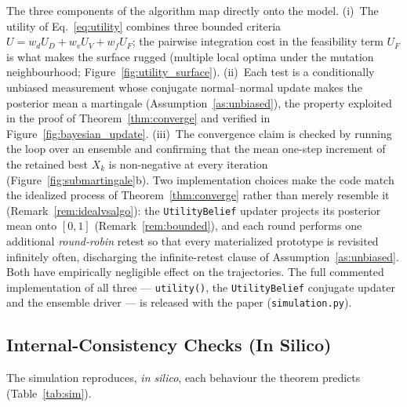 \documentclass[11pt]{article}
\begin{document}
The three components of the algorithm map directly onto the model. (i)~The utility of Eq.~\eqref{eq:utility} combines three bounded criteria $U=w_dU_D+w_vU_V+w_fU_F$; the pairwise integration cost in the feasibility term $U_F$ is what makes the surface rugged (multiple local optima under the mutation neighbourhood; Figure~\ref{fig:utility_surface}). (ii)~Each test is a conditionally unbiased measurement whose conjugate normal--normal update makes the posterior mean a martingale (Assumption~\ref{as:unbiased}), the property exploited in the proof of Theorem~\ref{thm:converge} and verified in Figure~\ref{fig:bayesian_update}. (iii)~The convergence claim is checked by running the loop over an ensemble and confirming that the mean one-step increment of the retained best $X_k$ is non-negative at every iteration (Figure~\ref{fig:submartingale}b). Two implementation choices make the code match the idealized process of Theorem~\ref{thm:converge} rather than merely resemble it (Remark~\ref{rem:idealvsalgo}): the \texttt{UtilityBelief} updater projects its posterior mean onto $[0,1]$ (Remark~\ref{rem:bounded}), and each round performs one additional \emph{round-robin} retest so that every materialized prototype is revisited infinitely often, discharging the infinite-retest clause of Assumption~\ref{as:unbiased}. Both have empirically negligible effect on the trajectories. The full commented implementation of all three --- \texttt{utility()}, the \texttt{UtilityBelief} conjugate updater and the ensemble driver --- is released with the paper (\texttt{simulation.py}).

\subsection{Internal-Consistency Checks (In Silico)}
\label{sec:checks}

The simulation reproduces, \emph{in silico}, each behaviour the theorem predicts (Table~\ref{tab:sim}).
\end{document}
